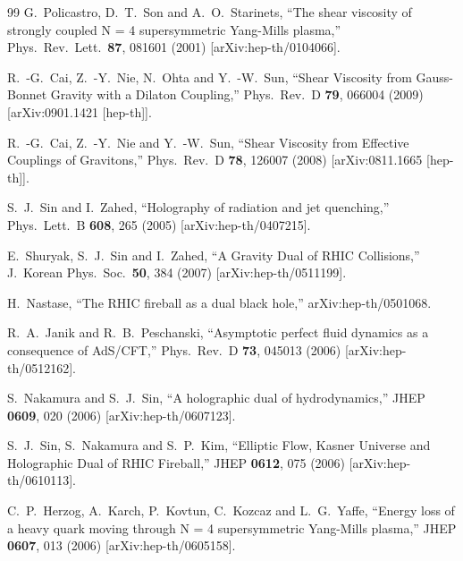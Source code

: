\documentclass[11pt,a4paper,psfrag]{article}
\begin{document}
\begin{thebibliography}{99}
  G.~Policastro, D.~T.~Son and A.~O.~Starinets,
 ``The shear viscosity of strongly coupled N = 4 supersymmetric Yang-Mills plasma,''
  Phys.\ Rev.\ Lett.\  {\bf 87}, 081601 (2001)
  [arXiv:hep-th/0104066].

  R.~-G.~Cai, Z.~-Y.~Nie, N.~Ohta and Y.~-W.~Sun,
  ``Shear Viscosity from Gauss-Bonnet Gravity with a Dilaton Coupling,''
 Phys.\ Rev.\ D {\bf 79}, 066004 (2009)  [arXiv:0901.1421 [hep-th]].  %

  R.~-G.~Cai, Z.~-Y.~Nie and Y.~-W.~Sun,
  ``Shear Viscosity from Effective Couplings of Gravitons,''
   Phys.\ Rev.\ D {\bf 78}, 126007 (2008)  [arXiv:0811.1665 [hep-th]].  %

  S.~J.~Sin and I.~Zahed,
  ``Holography of radiation and jet quenching,''
  Phys.\ Lett.\  B {\bf 608}, 265 (2005)
  [arXiv:hep-th/0407215].

  E.~Shuryak, S.~J.~Sin and I.~Zahed,
  ``A Gravity Dual of RHIC Collisions,''
  J.\ Korean Phys.\ Soc.\  {\bf 50}, 384 (2007)
  [arXiv:hep-th/0511199].

  H.~Nastase,
  ``The RHIC fireball as a dual black hole,''
  arXiv:hep-th/0501068.


  R.~A.~Janik and R.~B.~Peschanski,
  ``Asymptotic perfect fluid dynamics as a consequence of AdS/CFT,''
  Phys.\ Rev.\  D {\bf 73}, 045013 (2006)
  [arXiv:hep-th/0512162].

  S.~Nakamura and S.~J.~Sin,
  ``A holographic dual of hydrodynamics,''
  JHEP {\bf 0609}, 020 (2006)
  [arXiv:hep-th/0607123].

  S.~J.~Sin, S.~Nakamura and S.~P.~Kim,
  ``Elliptic Flow, Kasner Universe and Holographic Dual of RHIC Fireball,''
  JHEP {\bf 0612}, 075 (2006)
  [arXiv:hep-th/0610113].

  C.~P.~Herzog, A.~Karch, P.~Kovtun, C.~Kozcaz and L.~G.~Yaffe,
  ``Energy loss of a heavy quark moving through N = 4 supersymmetric Yang-Mills plasma,''
  JHEP {\bf 0607}, 013 (2006)
  [arXiv:hep-th/0605158].


\end{thebibliography}
\end{document}
